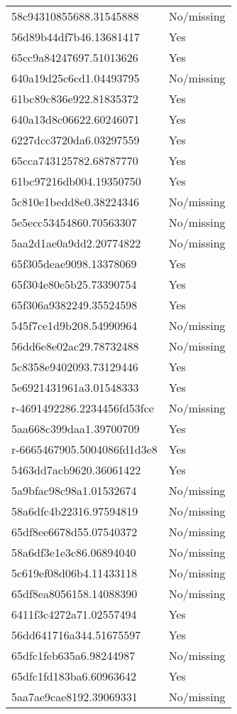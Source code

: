 \begin{tabular}{ll}
58c94310855688.31545888 & No/missing \\
56d89b44df7b46.13681417 & Yes \\
65cc9a84247697.51013626 & Yes \\
640a19d25c6cd1.04493795 & No/missing \\
61bc89c836e922.81835372 & Yes \\
640a13d8c06622.60246071 & Yes \\
6227dcc3720da6.03297559 & Yes \\
65cca743125782.68787770 & Yes \\
61bc97216db004.19350750 & Yes \\
5c810e1bedd8e0.38224346 & No/missing \\
5e5ecc53454860.70563307 & No/missing \\
5aa2d1ae0a9dd2.20774822 & No/missing \\
65f305deae9098.13378069 & Yes \\
65f304e80e5b25.73390754 & Yes \\
65f306a9382249.35524598 & Yes \\
545f7ce1d9b208.54990964 & No/missing \\
56dd6e8e02ac29.78732488 & No/missing \\
5c8358e9402093.73129446 & Yes \\
5e6921431961a3.01548333 & Yes \\
r-4691492286.2234456fd53fce & No/missing \\
5aa668c399daa1.39700709 & Yes \\
r-6665467905.5004086fd1d3e8 & Yes \\
5463dd7acb9620.36061422 & Yes \\
5a9bfac98c98a1.01532674 & No/missing \\
58a6dfc4b22316.97594819 & No/missing \\
65df8ee6678d55.07540372 & No/missing \\
58a6df3e1e3c86.06894040 & No/missing \\
5c619ef08d06b4.11433118 & No/missing \\
65df8ea8056158.14088390 & No/missing \\
6411f3c4272a71.02557494 & Yes \\
56dd641716a344.51675597 & Yes \\
65dfc1feb635a6.98244987 & No/missing \\
65dfc1fd183ba6.60963642 & Yes \\
5aa7ae9cae8192.39069331 & No/missing \\

\end{tabular}
